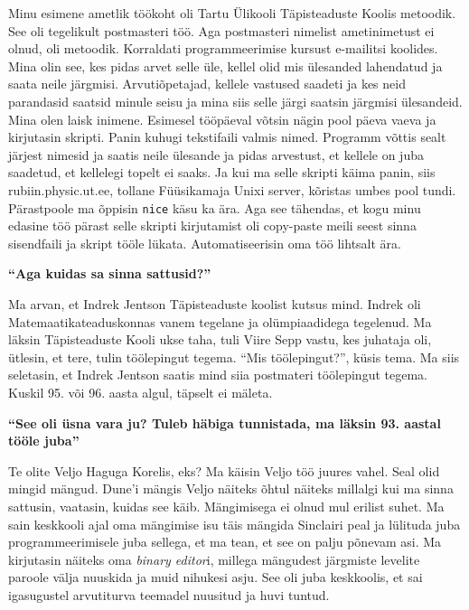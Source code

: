 Minu esimene ametlik töökoht oli Tartu Ülikooli Täpisteaduste Koolis metoodik. See oli tegelikult postmasteri töö. Aga postmasteri nimelist ametinimetust ei olnud, oli metoodik. Korraldati programmeerimise kursust e-mailitsi koolides. Mina olin see, kes pidas arvet selle üle, kellel olid mis ülesanded lahendatud ja saata neile järgmisi. Arvutiõpetajad, kellele vastused saadeti ja kes neid parandasid saatsid minule seisu ja mina siis selle järgi saatsin järgmisi ülesandeid. Mina olen laisk inimene. Esimesel tööpäeval võtsin nägin pool päeva vaeva ja kirjutasin skripti. Panin kuhugi tekstifaili valmis nimed. Programm võttis sealt järjest nimesid ja saatis neile ülesande ja pidas arvestust, et kellele on juba saadetud, et kellelegi topelt ei saaks. Ja kui ma selle skripti käima panin, siis rubiin.physic.ut.ee, tollane Füüsikamaja Unixi server, kõristas umbes pool tundi. Pärastpoole ma õppisin \verb|nice| käsu ka ära. Aga see tähendas, et kogu minu edasine töö pärast selle skripti kirjutamist oli copy-paste meili seest sinna sisendfaili ja skript tööle lükata. Automatiseerisin oma töö lihtsalt ära. 

\textbf{\enquote{Aga kuidas sa sinna sattusid?}}

Ma arvan, et Indrek Jentson Täpisteaduste koolist kutsus mind. Indrek oli Matemaatikateaduskonnas  vanem tegelane ja olümpiaadidega tegelenud. Ma läksin Täpisteaduste Kooli ukse taha, tuli Viire Sepp vastu, kes juhataja oli, ütlesin, et tere, tulin töölepingut tegema. \enquote{Mis töölepingut?}, küsis tema. Ma siis seletasin, et Indrek Jentson saatis mind siia postmateri töölepingut tegema. Kuskil 95. või 96. aasta algul, täpselt ei mäleta. 

\textbf{\enquote{See oli üsna vara ju? Tuleb häbiga tunnistada, ma läksin 93. aastal tööle juba}}

Te olite Veljo Haguga Korelis, eks? Ma käisin Veljo töö juures vahel. Seal olid mingid mängud. Dune'i mängis Veljo näiteks õhtul näiteks millalgi kui ma sinna sattusin, vaatasin, kuidas see käib. Mängimisega ei olnud mul erilist suhet. Ma sain keskkooli ajal oma mängimise isu täis mängida Sinclairi peal ja lülituda juba programmeerimisele juba sellega, et ma tean, et see on palju põnevam asi. Ma kirjutasin näiteks oma \emph{binary editor}i, millega mängudest järgmiste levelite paroole välja nuuskida ja muid nihukesi asju. See oli juba keskkoolis, et sai igasugustel arvutiturva teemadel nuusitud ja huvi tuntud. 


